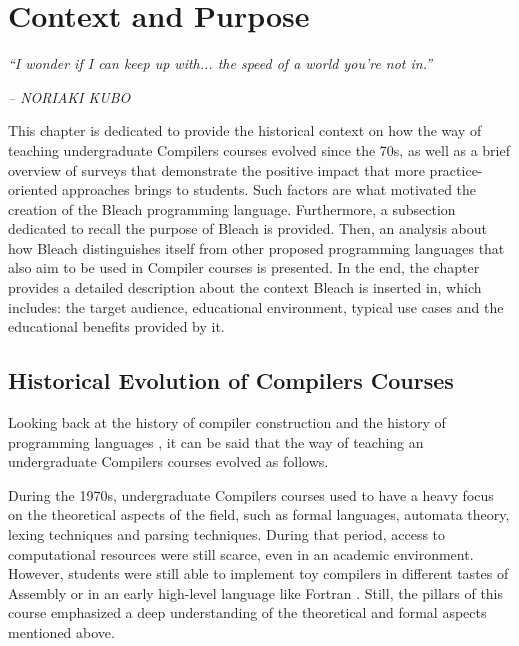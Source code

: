\chapter{Context and Purpose} \label{cap:metodologia}

\begin{displayquote}
    \begin{center}
        \textit{``I wonder if I can keep up with... the speed of a world you're not in.''}
    \end{center}
\end{displayquote}

\begin{flushright}
   \textit{-- NORIAKI KUBO}
\end{flushright}

This chapter is dedicated to provide the historical context on how the way of teaching undergraduate Compilers courses evolved since the 70s, as well as a brief overview of surveys that demonstrate the positive impact that more practice-oriented approaches brings to students. Such factors are what motivated the creation of the Bleach programming language. Furthermore, a subsection dedicated to recall the purpose of Bleach is provided. Then, an analysis about how Bleach distinguishes itself from other proposed programming languages that also aim to be used in Compiler courses is presented. In the end, the chapter provides a detailed description about the context Bleach is inserted in, which includes: the target audience, educational environment, typical use cases and the educational benefits provided by it.

\section{Historical Evolution of Compilers Courses}
Looking back at the history of compiler construction \cite{wikipedia_compiler_construction} and the history of programming languages \cite{wikipedia_programming_languages}, it can be said that the way of teaching an undergraduate Compilers courses evolved as follows.

During the 1970s, undergraduate Compilers courses used to have a heavy focus on the theoretical aspects of the field, such as formal languages, automata theory, lexing techniques and parsing techniques. During that period, access to computational resources were still scarce, even in an academic environment. However, students were still able to implement toy compilers in different tastes of Assembly or in an early high-level language like Fortran \cite{fortran_official_website}. Still, the pillars of this course emphasized a deep understanding of the theoretical and formal aspects mentioned above.

